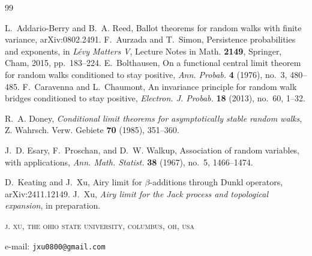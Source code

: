 \documentclass[11pt]{article}
\theoremstyle{plain}
\theoremstyle{definition}
\theoremstyle{remark}
\begin{document}
\begin{thebibliography}{99}

L.~Addario-Berry and B.~A. Reed,
Ballot theorems for random walks with finite variance,
arXiv:0802.2491.
F.~Aurzada and T.~Simon,
Persistence probabilities and exponents,
in \emph{Lévy Matters V}, Lecture Notes in Math. \textbf{2149},
Springer, Cham, 2015, pp.~183--224.
E.~Bolthausen,
On a functional central limit theorem for random walks conditioned to
stay positive,
\emph{Ann. Probab.} \textbf{4} (1976), no.~3, 480--485.
F.~Caravenna and L.~Chaumont,
An invariance principle for random walk bridges conditioned to stay
positive,
\emph{Electron. J. Probab.} \textbf{18} (2013), no.~60, 1--32.

R.~A. Doney,
\emph{Conditional limit theorems for asymptotically stable random walks},
Z. Wahrsch. Verw. Gebiete \textbf{70} (1985), 351--360.

J.~D. Esary, F.~Proschan, and D.~W. Walkup,
Association of random variables, with applications,
\emph{Ann. Math. Statist.} \textbf{38} (1967), no.~5, 1466--1474.

D.~Keating and J.~Xu,
Airy limit for \(\beta\)-additions through Dunkl operators,
arXiv:2411.12149.
J.~Xu,
\emph{Airy limit for the Jack process and topological expansion},
in preparation.

\end{thebibliography}

\medskip

\textsc{j. xu, the ohio state university, columbus, oh, usa}

e-mail: \texttt{jxu0800@gmail.com}
\end{document}
